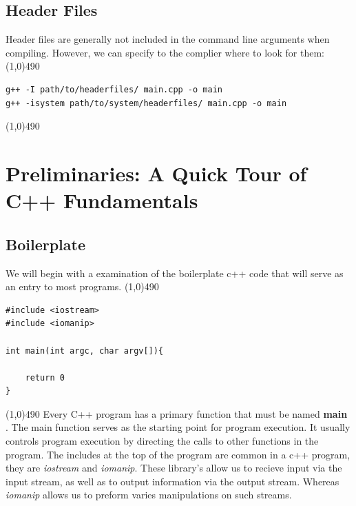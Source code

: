 \documentclass{report}
\begin{document}
    \bigbreak \noindent 
    \subsection{Header Files}
    Header files are generally not included in the command line arguments when compiling. However, we can specify to the complier where to look for them:
    \bigbreak \noindent 
    \line(1,0){490}
    \begin{verbatim}
g++ -I path/to/headerfiles/ main.cpp -o main
g++ -isystem path/to/system/headerfiles/ main.cpp -o main
    \end{verbatim}
    \line(1,0){490}
















    \pagebreak \bigbreak \noindent 
    \section{\LARGE Preliminaries: A Quick Tour of C++ Fundamentals}
    \bigbreak \noindent 
    \subsection{Boilerplate}
    \bigbreak \noindent 
    We will begin with a examination of the boilerplate c++ code that will serve as an entry to most programs.
    \line(1,0){490}
    \begin{verbatim}
#include <iostream>
#include <iomanip>

int main(int argc, char argv[]){

    return 0
}
    \end{verbatim}
    \line(1,0){490}
    \bigbreak \noindent 
    Every C++ program has a primary function that must be named \textbf{main} . The main function serves as the starting point for program execution. It usually controls program execution by directing the calls to other functions in the program.
    \bigbreak \noindent 
    The includes at the top of the program are common in a c++ program, they are \textit{iostream} and \textit{iomanip}. These library's allow us to recieve input via the input stream, as well as to output information  via the output stream. Whereas \textit{iomanip} allows us to preform varies manipulations on such streams.
    \bigbreak \noindent 
\end{document}

